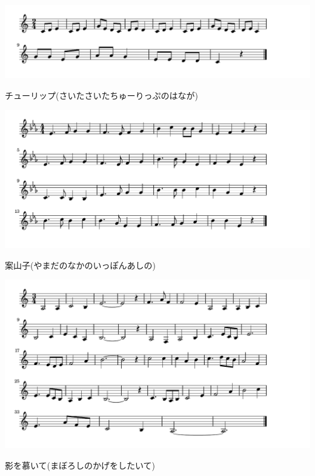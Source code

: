 \documentclass[a4paper]{ltjsarticle}
\begin{document}
\includegraphics[clip]{tulip_crop.pdf}

\vspace{-10mm} \hspace{10mm}
チューリップ(さいたさいたちゅーりっぷのはなが)

\includegraphics[clip]{kakashi_crop.pdf}

\vspace{-10mm} \hspace{10mm}
案山子(やまだのなかのいっぽんあしの)

\includegraphics[clip]{kagewoshitaite_crop.pdf}

\vspace{-10mm} \hspace{10mm}
影を慕いて(まぼろしのかげをしたいて)
\end{document}
